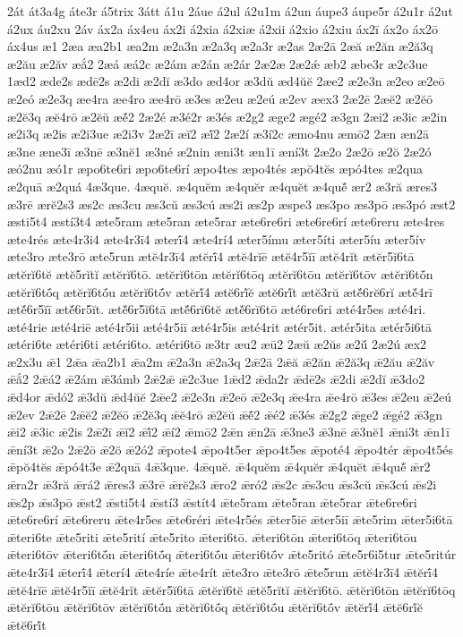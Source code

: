 {2át
át3a4g
áte3r
á5trix
3átt
á1u
2áue
á2ul
á2u1m
á2un
áupe3
áupe5r
á2u1r
á2ut
á2ux
áu2xu
2áv
áx2a
áx4eu
áx2i
á2xia
á2xiæ
á2xii
á2xio
á2xiu
áx2ī
áx2o
áx2ō
áx4us
æ1
2æa
æa2b1
æa2m
æ2a3n
æ2a3q
æ2a3r
æ2as
2æ2ā
2æă
æ2ăn
æ2ă3q
æ2ău
æ2ăv
æắ2
2æá
æá2c
æ2ám
æ2án
æ2ár
2æ2æ
2æ2ǽ
æb2
æbe3r
æ2c3ue
1æd2
æde2s
ædē2s
æ2di
æ2dĭ
æ3do
æd4or
æ3dŭ
æd4ŭĕ
2æe2
æ2e3n
æ2eo
æ2eō
æ2eó
æ2e3q
æe4ra
æe4ro
æe4rō
æ3es
æ2eu
æ2eú
æ2ev
æex3
2æ2ē
2æĕ2
æ2ĕō
æ2ĕ3q
æĕ4rō
æ2ĕŭ
æĕ́2
2æ2é
æ3é2r
æ3és
æ2g2
æge2
ægé2
æ3gn
2æi2
æ3ic
æ2in
æ2i3q
æ2is
æ2i3ue
æ2i3v
2æ2ī
æĭ2
æĭ́2
2æ2í
æ3í2c
æmo4nu
æmō2
2æn
æn2ā
æ3ne
æne3ī
æ3nē
æ3nĕ1
æ3né
æ2nin
æni3t
æn1ī
æní3t
2æ2o
2æ2ō
æ2ŏ
2æ2ó
æó2nu
æó1r
æpo6te6ri
æpo6te6rí
æpo4tes
æpo4tés
æpŏ4tĕs
æpó4tes
æ2qua
æ2quā
æ2quá
4æ3que.
4æquĕ.
æ4quĕm
æ4quĕr
æ4quĕt
æ4quĕ́
ær2
æ3ră
æres3
æ3rē
ærĕ2s3
æs2c
æs3cu
æs3cŭ
æs3cú
æs2i
æs2p
æspe3
æs3po
æs3pō
æs3pó
æst2
æsti5t4
æstí3t4
æte5ram
æte5ran
æte5rar
æte6re6ri
æte6re6rí
æte6reru
æte4res
æte4rés
æte4r3i4
æte4r3ī4
æterī́4
æte4rí4
æter5ímu
æter5íti
æter5íu
æter5ív
æte3ro
æte3rō
æte5run
ætĕ4r3ī4
ætĕrī́4
ætĕ4rĭē
ætĕ4r5ĭī
ætĕ4rĭt
ætĕr5ĭ6tā
ætĕrĭ6tĕ
ætĕ5rĭtĭ
ætĕrĭ6tō.
ætĕrĭ6tōn
ætĕrĭ6tōq
ætĕrĭ6tōu
ætĕrĭ6tōv
ætĕrĭ6tṓn
ætĕrĭ6tṓq
ætĕrĭ6tṓu
ætĕrĭ6tṓv
ætĕrĭ́4
ætĕ6rĭ́ĕ
ætĕ6rĭ́t
ætĕ3rŭ
ætĕ́6rĕ6rĭ
ætĕ́4rī
ætĕ́6r5ĭī
ætĕ́6r5ĭt.
ætĕ́6r5ĭ6tā
ætĕ́6rĭ6tĕ
ætĕ́6rĭ6tō
æté6re6ri
æté4r5es
æté4ri.
æté4rie
æté4riē
æté4r5ii
æté4r5iī
æté4r5is
æté4rit
ætér5it.
ætér5ita
ætér5i6tā
ætéri6te
ætéri6ti
ætéri6to.
ætéri6tō
æ3tr
æu2
æū2
2æŭ
æ2ŭs
æ2ŭ́
2æ2ú
æx2
æ2x3u
ǣ1
2ǣa
ǣa2b1
ǣa2m
ǣ2a3n
ǣ2a3q
2ǣ2ā
2ǣă
ǣ2ăn
ǣ2ă3q
ǣ2ău
ǣ2ăv
ǣắ2
2ǣá2
ǣ2ám
ǣ3ámb
2ǣ2ǣ
ǣ2c3ue
1ǣd2
ǣda2r
ǣdē2s
ǣ2di
ǣ2dĭ
ǣ3do2
ǣd4or
ǣdó2
ǣ3dŭ
ǣd4ŭĕ
2ǣe2
ǣ2e3n
ǣ2eō
ǣ2e3q
ǣe4ra
ǣe4rō
ǣ3es
ǣ2eu
ǣ2eú
ǣ2ev
2ǣ2ē
2ǣĕ2
ǣ2ĕō
ǣ2ĕ3q
ǣĕ4rō
ǣ2ĕŭ
ǣĕ́2
ǣé2
ǣ3és
ǣ2g2
ǣge2
ǣgé2
ǣ3gn
ǣi2
ǣ3ic
ǣ2is
2ǣ2ī
ǣĭ2
ǣĭ́2
ǣí2
ǣmō2
2ǣn
ǣn2ā
ǣ3ne3
ǣ3nē
ǣ3nĕ1
ǣni3t
ǣn1ī
ǣní3t
ǣ2o
2ǣ2ō
ǣ2ŏ
ǣ2ó2
ǣpote4
ǣpo4t5er
ǣpo4t5es
ǣpoté4
ǣpo4tér
ǣpo4t5és
ǣpŏ4tĕs
ǣpó4t3e
ǣ2quā
4ǣ3que.
4ǣquĕ.
ǣ4quĕm
ǣ4quĕr
ǣ4quĕt
ǣ4quĕ́
ǣr2
ǣra2r
ǣ3ră
ǣrá2
ǣres3
ǣ3rē
ǣrĕ2s3
ǣro2
ǣró2
ǣs2c
ǣs3cu
ǣs3cŭ
ǣs3cú
ǣs2i
ǣs2p
ǣs3pō
ǣst2
ǣsti5t4
ǣstí3
ǣstít4
ǣte5ram
ǣte5ran
ǣte5rar
ǣte6re6ri
ǣte6re6rí
ǣte6reru
ǣte4r5es
ǣte6réri
ǣte4r5és
ǣter5iē
ǣter5iī
ǣte5rim
ǣter5i6tā
ǣteri6te
ǣte5riti
ǣte5rití
ǣte5rito
ǣteri6tō.
ǣteri6tōn
ǣteri6tōq
ǣteri6tōu
ǣteri6tōv
ǣteri6tṓn
ǣteri6tṓq
ǣteri6tṓu
ǣteri6tṓv
ǣte5ritó
ǣte5r6i5tur
ǣte5ritúr
ǣte4r3ī4
ǣterī́4
ǣterí4
ǣte4ríe
ǣte4rít
ǣte3ro
ǣte3rō
ǣte5run
ǣtĕ4r3ī4
ǣtĕrī́4
ǣtĕ4rĭē
ǣtĕ4r5ĭī
ǣtĕ4rĭt
ǣtĕr5ĭ6tā
ǣtĕrĭ6tĕ
ǣtĕ5rĭtĭ
ǣtĕrĭ6tō.
ǣtĕrĭ6tōn
ǣtĕrĭ6tōq
ǣtĕrĭ6tōu
ǣtĕrĭ6tōv
ǣtĕrĭ6tṓn
ǣtĕrĭ6tṓq
ǣtĕrĭ6tṓu
ǣtĕrĭ6tṓv
ǣtĕrĭ́4
ǣtĕ6rĭ́ĕ
ǣtĕ6rĭ́t
}
